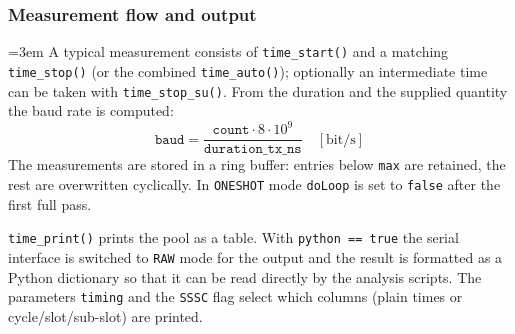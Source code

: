 \subsubsection*{Measurement flow and output}
{\sloppy\emergencystretch=3em
A typical measurement consists of \verb|time_start()| and a matching
\verb|time_stop()| (or the combined \verb|time_auto()|); optionally an
intermediate time can be taken with \verb|time_stop_su()|. From the duration
and the supplied quantity the baud rate is computed:
\[
  \mathtt{baud} = \frac{\mathtt{count} \cdot 8 \cdot 10^{9}}
                       {\mathtt{duration\_tx\_ns}} \quad [\mathrm{bit/s}]
\]
The measurements are stored in a ring buffer: entries below \verb|max| are
retained, the rest are overwritten cyclically. In \verb|ONESHOT| mode
\verb|doLoop| is set to \verb|false| after the first full pass.

\verb|time_print()| prints the pool as a table. With \verb|python == true| the
serial interface is switched to \verb|RAW| mode for the output and the result
is formatted as a Python dictionary so that it can be read directly by the
analysis scripts. The parameters \verb|timing| and the \verb|SSSC| flag select
which columns (plain times or cycle/slot/sub-slot) are printed.
\par}
